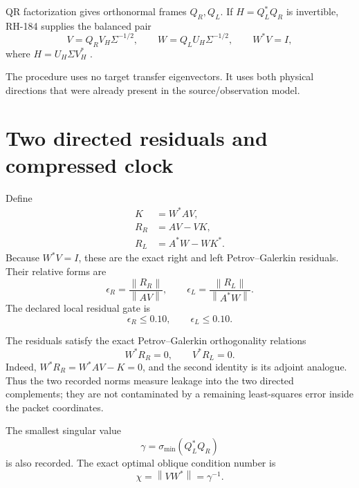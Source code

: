 \documentclass[12pt]{article}
\theoremstyle{remark}
\newcommand{\norm}[1]{\left\lVert#1\right\rVert}
\begin{document}
QR factorization gives orthonormal frames $Q_R,Q_L$.  If
$H=Q_L^*Q_R$ is invertible, RH-184 supplies the balanced pair
\begin{equation}\label{eq:balanced}
 V=Q_RV_H\Sigma^{-1/2},
 \qquad
 W=Q_LU_H\Sigma^{-1/2},
 \qquad W^*V=I,
\end{equation}
where $H=U_H\Sigma V_H^*$ \citep{WangRH184}.

The procedure uses no target transfer eigenvectors.  It uses both physical
directions that were already present in the source/observation model.

\section{Two directed residuals and compressed clock}

Define
\begin{align}
 K&=W^*AV,
 \label{eq:K}\\
 R_R&=AV-VK,
 \label{eq:RR}\\
 R_L&=A^*W-WK^*.
 \label{eq:RL}
\end{align}
Because $W^*V=I$, these are the exact right and left Petrov--Galerkin
residuals.  Their relative forms are
\begin{equation}\label{eq:relative}
 \epsilon_R=\frac{\norm{R_R}}{\norm{AV}},
 \qquad
 \epsilon_L=\frac{\norm{R_L}}{\norm{A^*W}}.
\end{equation}
The declared local residual gate is
\begin{equation}\label{eq:gate}
 \epsilon_R\le0.10,
 \qquad
 \epsilon_L\le0.10.
\end{equation}

The residuals satisfy the exact Petrov--Galerkin orthogonality relations
\begin{equation}\label{eq:petrov-orthogonality}
 W^*R_R=0,
 \qquad
 V^*R_L=0.
\end{equation}
Indeed, $W^*R_R=W^*AV-K=0$, and the second identity is its adjoint analogue.
Thus the two recorded norms measure leakage into the two directed
complements; they are not contaminated by a remaining least-squares error
inside the packet coordinates.

The smallest singular value
\begin{equation}\label{eq:sigma-cross}
 \gamma=\sigma_{\min}(Q_L^*Q_R)
\end{equation}
is also recorded.  The exact optimal oblique condition number is
\begin{equation}\label{eq:chi}
 \chi=\norm{VW^*}=\gamma^{-1}.
\end{equation}
\end{document}

